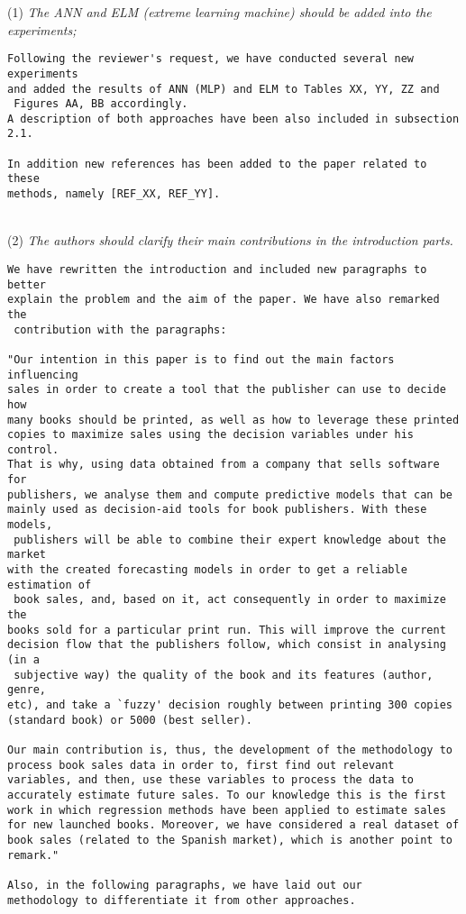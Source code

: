 \documentclass[preprint]{elsarticle}
\begin{document}
\noindent (1) \emph{The ANN and ELM (extreme learning machine) should be added into the experiments; } 

\begin{verbatim}
Following the reviewer's request, we have conducted several new experiments 
and added the results of ANN (MLP) and ELM to Tables XX, YY, ZZ and
 Figures AA, BB accordingly. 
A description of both approaches have been also included in subsection 2.1.

In addition new references has been added to the paper related to these 
methods, namely [REF_XX, REF_YY].
\end{verbatim}


~\\
\noindent (2) \emph{The authors should clarify their main contributions in the introduction parts.}

\begin{verbatim}
We have rewritten the introduction and included new paragraphs to better 
explain the problem and the aim of the paper. We have also remarked the
 contribution with the paragraphs:

"Our intention in this paper is to find out the main factors influencing
sales in order to create a tool that the publisher can use to decide how
many books should be printed, as well as how to leverage these printed
copies to maximize sales using the decision variables under his control. 
That is why, using data obtained from a company that sells software for 
publishers, we analyse them and compute predictive models that can be 
mainly used as decision-aid tools for book publishers. With these models,
 publishers will be able to combine their expert knowledge about the market 
with the created forecasting models in order to get a reliable estimation of
 book sales, and, based on it, act consequently in order to maximize the 
books sold for a particular print run. This will improve the current 
decision flow that the publishers follow, which consist in analysing (in a
 subjective way) the quality of the book and its features (author, genre, 
etc), and take a `fuzzy' decision roughly between printing 300 copies 
(standard book) or 5000 (best seller).

Our main contribution is, thus, the development of the methodology to process book sales data in order to, first find out relevant variables, and then, use these variables to process the data to accurately estimate future sales. To our knowledge this is the first work in which regression methods have been applied to estimate sales for new launched books. Moreover, we have considered a real dataset of book sales (related to the Spanish market), which is another point to remark."

Also, in the following paragraphs, we have laid out our 
methodology to differentiate it from other approaches.

\end{verbatim}
\end{document}
